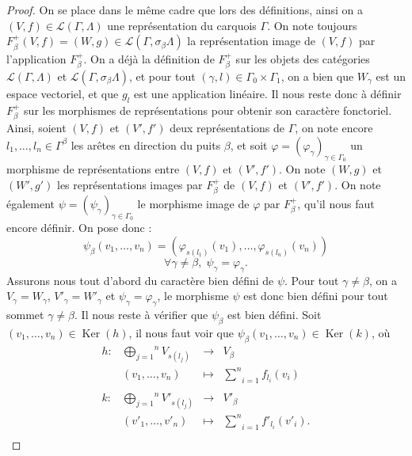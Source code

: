 \documentclass[a4paper,11pt]{article}
\DeclareMathOperator{\Ker}{Ker}
\begin{document}
\begin{proof}
	On se place dans le même cadre que lors des définitions, ainsi on a $(V,f)\in\mathscr{L}(\Gamma,\Lambda)$ une représentation du carquois $\Gamma$. On note toujours $F_{\beta}^{+}(V,f)=(W,g)\in\mathscr{L}(\Gamma,\sigma_{\beta}\Lambda)$ la représentation image de $(V,f)$ par l'application $F_{\beta}^{+}$. On a déjà la définition de $F_{\beta}^{+}$ sur les objets des catégories $\mathscr{L}(\Gamma,\Lambda)$ et $\mathscr{L}(\Gamma,\sigma_{\beta}\Lambda)$, et pour tout $(\gamma,l)\in\Gamma_{0}\times\Gamma_{1}$, on a bien que $W_{\gamma}$ est un espace vectoriel, et que $g_{l}$ est une application linéaire. Il nous reste donc à définir $F_{\beta}^{+}$ sur les morphismes de représentations pour obtenir son caractère fonctoriel. Ainsi, soient $(V,f)$ et $(V',f')$ deux représentations de $\Gamma$, on note encore $l_{1},\dots,l_{n}\in\Gamma^{\beta}$ les arêtes en direction du puits $\beta$, et soit $\varphi=(\varphi_{\gamma})_{\gamma\in\Gamma_{0}}$ un morphisme de représentations entre $(V,f)$ et $(V',f')$. On note $(W,g)$ et $(W',g')$ les représentations images par $F_{\beta}^{+}$ de $(V,f)$ et $(V',f')$. On note également $\psi=(\psi_{\gamma})_{\gamma\in\Gamma_{0}}$ le morphisme image de $\varphi$ par $F_{\beta}^{+}$, qu'il nous faut encore définir. On pose donc :
	\[	
		\psi_{\beta}(v_{1},\dots,v_{n})=(\varphi_{s(l_{1})}(v_{1}),\dots,\varphi_{s(l_{n})}(v_{n}))
	\]
	\[
		\forall \gamma\neq\beta,\; \psi_{\gamma}=\varphi_{\gamma}.
	\]
	Assurons nous tout d'abord du caractère bien défini de $\psi$. Pour tout $\gamma\neq\beta$, on a $V_{\gamma}=W_{\gamma}$, $V'_{\gamma}=W'_{\gamma}$ et $\psi_{\gamma}=\varphi_{\gamma}$, le morphisme $\psi$ est donc bien défini pour tout sommet $\gamma\neq\beta$. Il nous reste à vérifier que $\psi_{\beta}$ est bien défini. Soit $(v_{1},\dots,v_{n})\in\Ker(h)$, il nous faut voir que $\psi_{\beta}(v_{1},\dots,v_{n})\in\Ker(k)$, où
	\[
\begin{array}{lccc}
	h : & \overset{n}{\underset{j=1}{\bigoplus}}V_{s(l_{j})}&\rightarrow & V_{\beta} \\ 
	& (v_{1},\dots,v_{n})&\mapsto & \underset{i=1}{\overset{n}{\sum}}f_{l_{i}}(v_{i})\\
	&&&\\
	k : & \overset{n}{\underset{j=1}{\bigoplus}}V'_{s(l_{j})}&\rightarrow & V'_{\beta} \\ 
	& (v'_{1},\dots,v'_{n})&\mapsto & \underset{i=1}{\overset{n}{\sum}}f'_{l_{i}}(v'_{i}).\\
\end{array}
\]
\end{proof}
\end{document}
